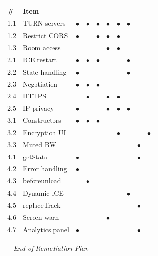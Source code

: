 \documentclass[11pt,letterpaper]{article}
\begin{document}
\begin{center}
\begin{tabularx}{\textwidth}{C{0.5cm}L{3.2cm}C{1.1cm}C{1.1cm}C{1.1cm}C{1.1cm}C{1.1cm}C{1.1cm}C{1.1cm}C{1.1cm}}
\toprule
\textbf{\#} & \textbf{Item} &  &  &  &  &  &  &  &  \\
 & TURN servers & $\bullet$ & $\bullet$ & $\bullet$ & $\bullet$ & $\bullet$ & $\bullet$ & & \\
1.2 & Restrict CORS & $\bullet$ & & $\bullet$ & $\bullet$ & $\bullet$ & & & \\
1.3 & Room access & & & & $\bullet$ & $\bullet$ & & & \\
2.1 & ICE restart & $\bullet$ & $\bullet$ & $\bullet$ & & & $\bullet$ & & \\
2.2 & State handling & $\bullet$ & & & & & $\bullet$ & & \\
2.3 & Negotiation & $\bullet$ & $\bullet$ & $\bullet$ & & & & & \\
2.4 & HTTPS & & $\bullet$ & & $\bullet$ & $\bullet$ & & & \\
2.5 & IP privacy & $\bullet$ & & & $\bullet$ & $\bullet$ & $\bullet$ & & \\
3.1 & Constructors & $\bullet$ & $\bullet$ & $\bullet$ & & & & & \\
3.2 & Encryption UI & & & & & $\bullet$ & & & $\bullet$ \\
3.3 & Muted BW & & & & & & & $\bullet$ & \\
4.1 & getStats & $\bullet$ & & & & & & $\bullet$ & \\
4.2 & Error handling & $\bullet$ & & & & & & & \\
4.3 & beforeunload & & $\bullet$ & & & & & & \\
4.4 & Dynamic ICE & & & & & & $\bullet$ & & \\
4.5 & replaceTrack & & & & & & & $\bullet$ & \\
4.6 & Screen warn & & & & $\bullet$ & & & & \\
4.7 & Analytics panel & $\bullet$ & & & & & & $\bullet$ & \\
\bottomrule
\end{tabularx}
\end{center}

\vspace{1cm}
\begin{center}
\textit{--- End of Remediation Plan ---}
\end{center}
\end{document}
